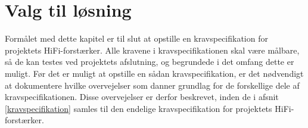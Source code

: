 \chapter{Valg til løsning}
\label{valgafloesning}
Formålet med dette kapitel er til slut at opstille en kravspecifikation for projektets HiFi-forstærker. Alle kravene i kravspecifikationen skal være målbare, så de kan testes ved projektets afslutning, og begrundede i det omfang dette er muligt. Før det er muligt at opstille en sådan kravspecifikation, er det nødvendigt at dokumentere hvilke overvejelser som danner grundlag for de forskellige dele af kravspecifikationen. Disse overvejelser er derfor beskrevet, inden de i afsnit \ref{kravspecifikation} samles til den endelige kravspecifikation for projektets HiFi-forstærker. 
